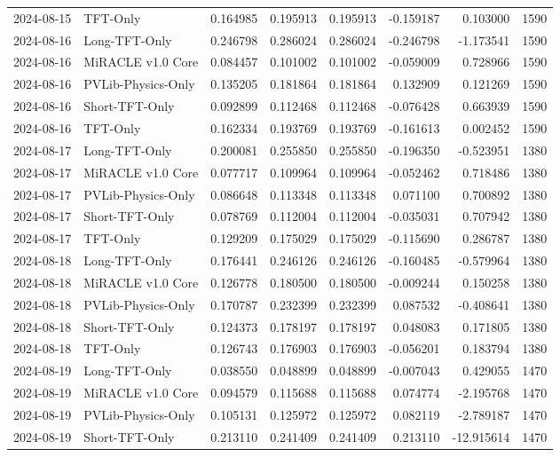 \begin{tabular}{llrrrrrr}
2024-08-15 & TFT-Only & 0.164985 & 0.195913 & 0.195913 & -0.159187 & 0.103000 & 1590 \\
2024-08-16 & Long-TFT-Only & 0.246798 & 0.286024 & 0.286024 & -0.246798 & -1.173541 & 1590 \\
2024-08-16 & MiRACLE v1.0 Core & 0.084457 & 0.101002 & 0.101002 & -0.059009 & 0.728966 & 1590 \\
2024-08-16 & PVLib-Physics-Only & 0.135205 & 0.181864 & 0.181864 & 0.132909 & 0.121269 & 1590 \\
2024-08-16 & Short-TFT-Only & 0.092899 & 0.112468 & 0.112468 & -0.076428 & 0.663939 & 1590 \\
2024-08-16 & TFT-Only & 0.162334 & 0.193769 & 0.193769 & -0.161613 & 0.002452 & 1590 \\
2024-08-17 & Long-TFT-Only & 0.200081 & 0.255850 & 0.255850 & -0.196350 & -0.523951 & 1380 \\
2024-08-17 & MiRACLE v1.0 Core & 0.077717 & 0.109964 & 0.109964 & -0.052462 & 0.718486 & 1380 \\
2024-08-17 & PVLib-Physics-Only & 0.086648 & 0.113348 & 0.113348 & 0.071100 & 0.700892 & 1380 \\
2024-08-17 & Short-TFT-Only & 0.078769 & 0.112004 & 0.112004 & -0.035031 & 0.707942 & 1380 \\
2024-08-17 & TFT-Only & 0.129209 & 0.175029 & 0.175029 & -0.115690 & 0.286787 & 1380 \\
2024-08-18 & Long-TFT-Only & 0.176441 & 0.246126 & 0.246126 & -0.160485 & -0.579964 & 1380 \\
2024-08-18 & MiRACLE v1.0 Core & 0.126778 & 0.180500 & 0.180500 & -0.009244 & 0.150258 & 1380 \\
2024-08-18 & PVLib-Physics-Only & 0.170787 & 0.232399 & 0.232399 & 0.087532 & -0.408641 & 1380 \\
2024-08-18 & Short-TFT-Only & 0.124373 & 0.178197 & 0.178197 & 0.048083 & 0.171805 & 1380 \\
2024-08-18 & TFT-Only & 0.126743 & 0.176903 & 0.176903 & -0.056201 & 0.183794 & 1380 \\
2024-08-19 & Long-TFT-Only & 0.038550 & 0.048899 & 0.048899 & -0.007043 & 0.429055 & 1470 \\
2024-08-19 & MiRACLE v1.0 Core & 0.094579 & 0.115688 & 0.115688 & 0.074774 & -2.195768 & 1470 \\
2024-08-19 & PVLib-Physics-Only & 0.105131 & 0.125972 & 0.125972 & 0.082119 & -2.789187 & 1470 \\
2024-08-19 & Short-TFT-Only & 0.213110 & 0.241409 & 0.241409 & 0.213110 & -12.915614 & 1470 \\

\end{tabular}
